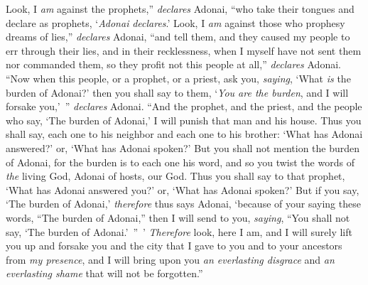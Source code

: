 \begin{biblechapter}
\verse Look, I \textit{am} against the prophets,” \textit{declares} Adonai, “who take their tongues and declare as prophets, ‘\textit{Adonai} \textit{declares}.’
\verse Look, I \textit{am} against those who prophesy dreams of lies,” \textit{declares} Adonai, “and tell them, and they caused my people to err through their lies, and in their recklessness, when I myself have not sent them nor commanded them, so they profit not this people at all,” \textit{declares} Adonai.
\verse “Now when this people, or a prophet, or a priest, ask you, \textit{saying}, ‘What \textit{is} the burden of Adonai?’ then you shall say to them, ‘\textit{You are the burden}, and I will forsake you,’ ” \textit{declares} Adonai.
\verse “And the prophet, and the priest, and the people who say, ‘The burden of Adonai,’ I will punish that man and his house.
\verse Thus you shall say, each one to his neighbor and each one to his brother: ‘What has Adonai answered?’ or, ‘What has Adonai spoken?’
\verse But you shall not mention the burden of Adonai, for the burden is to each one his word, and so you twist the words of \textit{the} living God, Adonai of hosts, our God.
\verse Thus you shall say to that prophet, ‘What has Adonai answered you?’ or, ‘What has Adonai spoken?’
\verse But if you say, ‘The burden of Adonai,’ \textit{therefore} thus says Adonai, ‘because of your saying these words, “The burden of Adonai,” then I will send to you, \textit{saying}, “You shall not say, ‘The burden of Adonai.’ ” ’
\verse \textit{Therefore} look, here I am, and I will surely lift you up and forsake you and the city that I gave to you and to your ancestors from \textit{my presence},
\verse and I will bring upon you \textit{an everlasting disgrace} and \textit{an everlasting shame} that will not be forgotten.”
\end{biblechapter}

